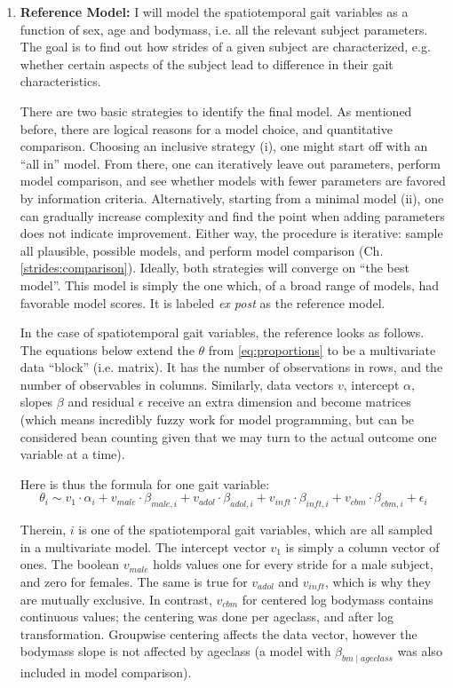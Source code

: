 \begin{enumerate}
\item \textbf{Reference Model:}
\label{sec:orge7f3220}
I will model the spatiotemporal gait variables as a function of sex, age and bodymass, i.e. all the relevant subject parameters.
The goal is to find out how strides of a given subject are characterized, e.g. whether certain aspects of the subject lead to difference in their gait characteristics.

There are two basic strategies to identify the final model.
As mentioned before, there are logical reasons for a model choice, and quantitative comparison.
Choosing an inclusive strategy (i), one might start off with an ``all in'' model.
From there, one can iteratively leave out parameters, perform model comparison, and see whether models with fewer parameters are favored by information criteria.
Alternatively, starting from a minimal model (ii), one can gradually increase complexity and find the point when adding parameters does not indicate improvement.
Either way, the procedure is iterative: sample all plausible, possible models, and perform model comparison (Ch. \ref{strides:comparison}).
Ideally, both strategies will converge on ``the best model''.
This model is simply the one which, of a broad range of models, had favorable model scores.
It is labeled \emph{ex post} as the reference model.


In the case of spatiotemporal gait variables, the reference looks as follows.
The equations below extend the \(\theta\) from \eqref{eq:proportions} to be a multivariate data ``block'' (i.e. matrix).
It has the number of observations in rows, and the number of observables in columns.
Similarly, data vectors \(v\), intercept \(\alpha\), slopes \(\beta\) and residual \(\epsilon\) receive an extra dimension and become matrices (which means incredibly fuzzy work for model programming, but can be considered bean counting given that we may turn to the actual outcome one variable at a time).

Here is thus the formula for one gait variable:
\begin{equation} \theta_{i} \sim v_{1}\cdot\alpha_{i} + v_{male}\cdot\beta_{male,i} + v_{adol}\cdot\beta_{adol,i} + v_{inft}\cdot\beta_{inft,i} + v_{cbm}\cdot\beta_{cbm,i} + \epsilon_{i} \label{eq:stride} \end{equation}

Therein, \(i\) is one of the spatiotemporal gait variables, which are all sampled in a multivariate model.
The intercept vector \(v_{1}\) is simply a column vector of ones.
The boolean \(v_{male}\) holds values one for every stride for a male subject, and zero for females.
The same is true for \(v_{adol}\) and \(v_{inft}\), which is why they are mutually exclusive.
In contrast, \(v_{cbm}\) for centered log bodymass contains continuous values; the centering was done per ageclass, and after log transformation.
Groupwise centering affects the data vector, however the bodymass slope is not affected by ageclass (a model with \(\beta_{bm\mid ageclass}\) was also included in model comparison).



\end{enumerate}
